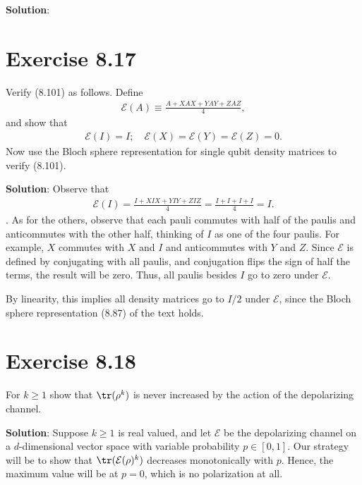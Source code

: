 \documentclass{book}
\begin{document}
    \textbf{Solution}:

\section*{Exercise 8.17}
    Verify (8.101) as follows. Define
    \begin{align}
        \mathcal{E}(A) \equiv \frac{A + XAX + YAY + ZAZ}{4},
    \end{align}
    and show that
    \begin{align}
        \mathcal{E}(I) = I; \quad \mathcal{E}(X) = \mathcal{E}(Y) = \mathcal{E}(Z) = 0.
    \end{align}
    Now use the Bloch sphere representation for single qubit density matrices to verify (8.101).

    \textbf{Solution}: Observe that
    \begin{align}
        \mathcal{E}(I) = \frac{I + X IX + YIY + ZIZ}{4} = \frac{I + I + I + I}{4} = I.
    \end{align}.
    As for the others, observe that each pauli commutes with half of the paulis and anticommutes with the other half, thinking of $I$ as one of the four paulis. For example, $X$ commutes with $X$ and $I$ and anticommutes with $Y$ and $Z$. Since $\mathcal{E}$ is defined by conjugating with all paulis, and conjugation flips the sign of half the terms, the result will be zero. Thus, all paulis besides $I$ go to zero under $\mathcal{E}$.

    By linearity, this implies all density matrices go to $I/2$ under $\mathcal{E}$, since the Bloch sphere representation (8.87) of the text holds.

\section*{Exercise 8.18}
    For $k\geq 1$ show that $\tr(\rho^k)$ is never increased by the action of the depolarizing channel.

    \textbf{Solution}: Suppose $k \geq 1$ is real valued, and let $\mathcal{E}$ be the depolarizing channel on a $d$-dimensional vector space with variable probability $p \in [0,1]$. Our strategy will be to show that $\tr(\mathcal{E}(\rho)^k)$ decreases monotonically with $p$. Hence, the maximum value will be at $p =0$, which is no polarization at all. 
\end{document}
